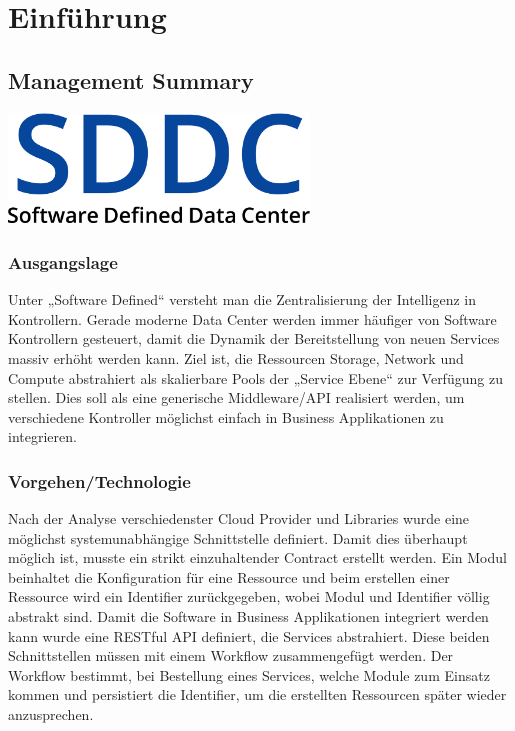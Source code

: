 \part{Einführung}
\chapter{Management Summary}
\begin{center}
  \includegraphics[width=0.6\textwidth]{./22_Grafiken/01_Logo/SDDC}
\end{center}
\section*{Ausgangslage}
Unter „Software Defined“ versteht man die Zentralisierung der Intelligenz in Kontrollern. Gerade moderne Data Center werden immer häufiger von Software Kontrollern gesteuert, damit die Dynamik der Bereitstellung von neuen Services massiv erhöht werden kann. 
Ziel ist, die Ressourcen Storage, Network und Compute abstrahiert als skalierbare Pools der „Service Ebene“ zur Verfügung zu stellen. Dies soll als eine generische Middleware/\ac{API} realisiert werden, um verschiedene Kontroller möglichst einfach in Business Applikationen zu integrieren.

\section*{Vorgehen/Technologie}
Nach der Analyse verschiedenster Cloud Provider und Libraries wurde eine möglichst systemunabhängige Schnittstelle definiert. Damit dies überhaupt möglich ist, musste ein strikt einzuhaltender Contract erstellt werden. Ein Modul beinhaltet die Konfiguration für eine Ressource und beim erstellen einer Ressource wird ein Identifier zurückgegeben, wobei Modul und Identifier völlig abstrakt sind. Damit die Software in Business Applikationen integriert werden kann wurde eine RESTful API definiert, die Services abstrahiert. Diese beiden Schnittstellen müssen mit einem Workflow zusammengefügt werden. Der Workflow bestimmt, bei Bestellung eines Services,  welche Module zum Einsatz kommen und persistiert die Identifier, um die erstellten Ressourcen später wieder anzusprechen.

